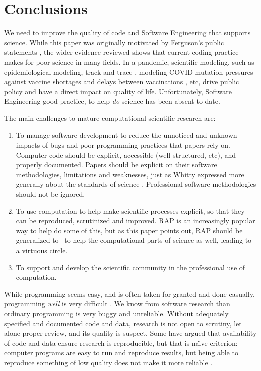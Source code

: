 \documentclass{comjnl}
\begin{document}
\section{Conclusions}
We need to improve the quality of code and Software Engineering that supports science. While this paper was originally motivated by Ferguson's public statements , the wider evidence reviewed shows that current coding practice makes for poor science in many fields. In a pandemic, scientific modeling, such as epidemiological modeling, track and trace \cite{excel-fiasco}, modeling COVID mutation pressures against vaccine shortages and delays between vaccinations \cite{science-delays}, etc, drive public policy and have a direct impact on quality of life. Unfortunately, Software Engineering good practice, to help \emph{do\/} science has been absent to date.

The main challenges to mature computational scientific research are:

\begin{enumerate}\raggedright
\item 
To manage software development to reduce the unnoticed and unknown impacts of bugs and poor programming practices that papers rely on. Computer code should be explicit, accessible (well-structured, etc), and properly documented. Papers should be explicit on their software methodologies, limitations and weaknesses, just as Whitty expressed more generally about the standards of science \cite{whitty}. Professional software methodologies should not be ignored.

\item 
To use computation to help make scientific processes explicit, so that they can be reproduced, scrutinized and improved. RAP is an increasingly popular way to help do some of this, but as this paper points out, RAP should be generalized to \RAPstar\ to help the computational parts of science as well, leading to a virtuous circle.

\item
To support and develop the scientific community in the professional use of computation.
\end{enumerate}

While programming seems easy, and is often taken for granted and done casually, programming \emph{well\/} is very difficult \cite{fixit}. We know from software research than ordinary programming is very buggy and unreliable. Without adequately specified and documented code and data, research is not open to scrutiny, let alone proper review, and its quality is suspect. Some have argued that availability of code and data ensure research is reproducible, but that is na\"\i ve criterion: computer programs are easy to run and reproduce results, but being able to reproduce something of low quality does not make it more reliable \cite{reproducibility,relit,popper-conjectures-refutations}. 
\end{document}

